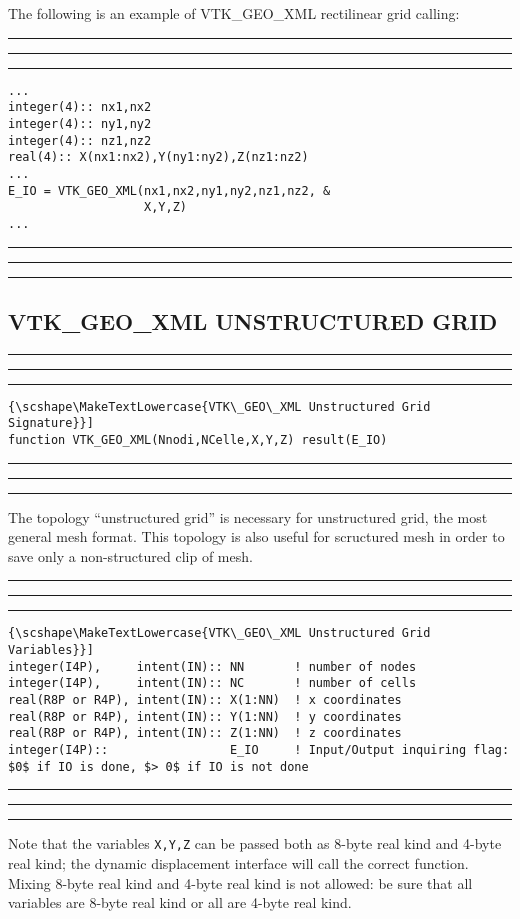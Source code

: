 \documentclass[pagesize=pdftex,fontsize=10pt,paper=a4,oneside]{scrbook}
\DeclareRobustCommand{\MarginNote}[1]{\marginpar{%
\slshape\footnotesize%
\parindent=0pt\lineskip=0pt\lineskiplimit=0pt%
\tolerance=2000\hyphenpenalty=300\exhyphenpenalty=300%
\doublehyphendemerits=100000\finalhyphendemerits=\doublehyphendemerits%
\raggedright\hspace{0pt}#1}}
\newenvironment{boxred}[1]%
               {%
                \noindent\hspace*{-0.025\textwidth}%
                \color{Maroon}%
                \rule[-5.8pt]{0.6pt}{6pt}\hspace*{-0.6pt}\rule{1.05\textwidth}{0.6pt}\hspace*{-0.6pt}\rule[-5.8pt]{0.6pt}{6pt}%
                \color{black}%
                \vspace*{0.6pt}\MarginNote{\color{Maroon}{#1}}%
               }%
               {%
                \noindent\hspace*{-0.025\textwidth}%
                \color{Maroon}%
                \rule[0pt]{0.6pt}{6pt}\hspace*{-0.6pt}\rule{1.05\textwidth}{0.6pt}\hspace*{-0.6pt}\rule[0pt]{0.6pt}{6pt}%
                \color{black}%
                \vspace*{2mm}%
               }
\newcommand{\virgo}[1]{``{#1}''}
\DeclareRobustCommand{\MaiuscolettoBS}[1]{\textls[80]{\scshape\MakeTextLowercase{#1}}}
\begin{document}
The following is an example of VTK\_GEO\_XML rectilinear grid calling:

\begin{boxred}{VTK\_GEO\_XML Structured Grid Calling}
\begin{verbatim}
...
integer(4):: nx1,nx2
integer(4):: ny1,ny2
integer(4):: nz1,nz2
real(4):: X(nx1:nx2),Y(ny1:ny2),Z(nz1:nz2)
...
E_IO = VTK_GEO_XML(nx1,nx2,ny1,ny2,nz1,nz2, &
                   X,Y,Z)
...
\end{verbatim}
\end{boxred}

\subsection{VTK\_GEO\_XML UNSTRUCTURED GRID}

\begin{boxred}{}
\begin{lstlisting}[style=signature,title=\color{Maroon}\MaiuscolettoBS{VTK\_GEO\_XML Unstructured Grid Signature}]
function VTK_GEO_XML(Nnodi,NCelle,X,Y,Z) result(E_IO)
\end{lstlisting}
\end{boxred}

The topology \virgo{unstructured grid} is necessary for unstructured grid, the most general mesh format. This topology
is also useful for scructured mesh in order to save only a non-structured clip of mesh.

\begin{boxred}{}
\begin{lstlisting}[style=variables,title=\color{Maroon}\MaiuscolettoBS{VTK\_GEO\_XML Unstructured Grid Variables}]
integer(I4P),     intent(IN):: NN       ! number of nodes
integer(I4P),     intent(IN):: NC       ! number of cells
real(R8P or R4P), intent(IN):: X(1:NN)  ! x coordinates
real(R8P or R4P), intent(IN):: Y(1:NN)  ! y coordinates
real(R8P or R4P), intent(IN):: Z(1:NN)  ! z coordinates
integer(I4P)::                 E_IO     ! Input/Output inquiring flag: $0$ if IO is done, $> 0$ if IO is not done
\end{lstlisting}
\end{boxred}

Note that the variables \texttt{X,Y,Z} can be passed both as 8-byte real kind and 4-byte real kind; the dynamic
displacement interface will call the correct function. Mixing 8-byte real kind and 4-byte real kind is not allowed: be
sure that all variables are 8-byte real kind or all are 4-byte real kind.
\end{document}
